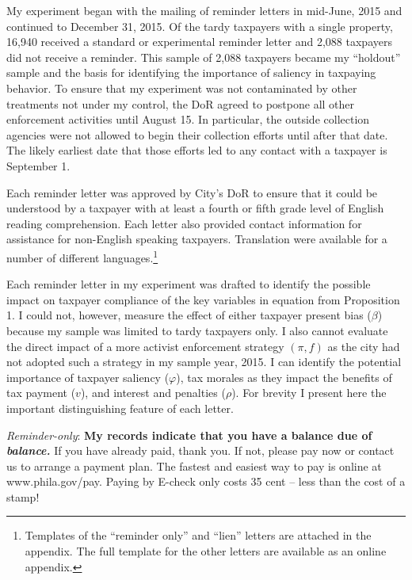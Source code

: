 My experiment began with the mailing of reminder
letters in mid-June, 2015 and continued to December 31, 2015.  Of the
tardy taxpayers with a single property, 16,940 received a standard or experimental
reminder letter and 2,088 taxpayers did not receive a
reminder.  This sample of 2,088 taxpayers became my ``holdout''
sample and the basis for identifying the importance of saliency in
taxpaying behavior. To ensure that my experiment was not contaminated
by other treatments not under my control, the DoR agreed to postpone
all other enforcement activities until August 15.  In particular, the
outside collection agencies were not allowed to begin their collection
efforts until after that date.  The likely earliest date that those
efforts led to any contact with a taxpayer is September 1.

Each reminder letter was
approved by City's DoR to ensure that it could be understood by a
taxpayer with at least a fourth or fifth grade level of English
reading comprehension.  Each letter also provided contact information
for assistance for non-English speaking taxpayers.  Translation were
available for a number of different languages.\footnote{Templates of the 
``reminder only'' and ``lien'' letters  are attached in the  appendix. 
The full  template for the other letters are available as an online appendix.} 

Each reminder letter in my experiment was drafted to identify the
possible impact on taxpayer compliance of the key variables in
equation from Proposition 1.  I could not, however, measure the effect of
either taxpayer present bias ($\beta$) because my sample was limited
to tardy taxpayers only. I also cannot evaluate the direct
impact of a more activist enforcement strategy $(\pi, f)$ as the city
had not adopted such a strategy in my sample year, 2015. I can identify the potential importance of taxpayer saliency
($\varphi$), tax morales as they impact the benefits of tax payment
($v$), and interest and penalties ($\rho$). 
 For
brevity I present here the important distinguishing feature of each
letter.

\bigskip

\noindent \textit{Reminder-only}: \textbf{My records indicate 
that you have a balance due of \textit{balance. }} If you have 
already paid, thank you.  If not, please pay now or contact us 
to arrange a payment plan.  The fastest and easiest way to pay is 
online at  www.phila.gov/pay. Paying by E-check only costs 35 cent 
-- less than the cost of a stamp!

